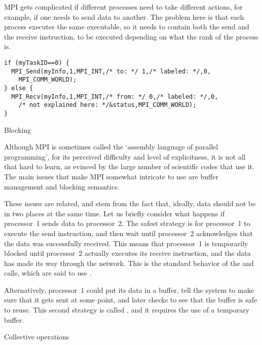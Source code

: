 MPI gets complicated if different processes need to take
different actions, for example, if one needs to send data to
another. The problem here is that each process executes the same
executable, so it needs to contain both the send and the receive
instruction, to be executed depending on what the rank of the process
is.
\begin{verbatim}
if (myTaskID==0) {
  MPI_Send(myInfo,1,MPI_INT,/* to: */ 1,/* labeled: */,0,
    MPI_COMM_WORLD);
} else {
  MPI_Recv(myInfo,1,MPI_INT,/* from: */ 0,/* labeled: */,0,
    /* not explained here: */&status,MPI_COMM_WORLD);
}   
\end{verbatim}

 {Blocking}
\label{sec:blocking}

Although MPI is sometimes called the `assembly language of parallel
programming', for its perceived difficulty and level of explicitness,
it is not all that hard to learn, as evinced by the large number of scientific
codes that use it. The main issues that make MPI somewhat intricate to
use are buffer management and blocking semantics.

These issues are related, and stem from the fact that, ideally, data
should not be in two places at the same time. Let us briefly
consider what happens if processor~1 sends data to processor~2. The
safest strategy is for processor~1 to execute the send instruction,
and then wait until processor~2 acknowledges that the data was
successfully received. This means that processor~1 is temporarily
blocked until processor~2 actually executes its receive instruction,
and the data has made its way through the network. This is the
standard behavior of the  and  calls, which
are said to use .

Alternatively,
processor~1 could put its data in a buffer, tell the system to make
sure that it gets sent at some point, and later checks to see that the
buffer is safe to reuse. This second strategy is called
, and it requires the use
of a temporary buffer.

 {Collective operations}
\label{sec:mpi-collective}

